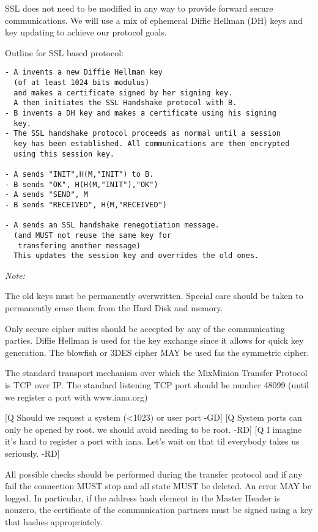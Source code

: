 \documentclass{article}
\begin{document}
SSL does not need to be modified in any way to provide forward secure
communications. We will use a mix of ephemeral Diffie Hellman (DH)
keys and key updating to achieve our protocol goals.

Outline for SSL based protocol:

\begin{verbatim}
- A invents a new Diffie Hellman key 
  (of at least 1024 bits modulus)
  and makes a certificate signed by her signing key.
  A then initiates the SSL Handshake protocol with B.
- B invents a DH key and makes a certificate using his signing
  key.
- The SSL handshake protocol proceeds as normal until a session
  key has been established. All communications are then encrypted
  using this session key.

- A sends "INIT",H(M,"INIT") to B.
- B sends "OK", H(H(M,"INIT"),"OK")
- A sends "SEND", M
- B sends "RECEIVED", H(M,"RECEIVED")

- A sends an SSL handshake renegotiation message.
  (and MUST not reuse the same key for 
   transfering another message)
  This updates the session key and overrides the old ones.
\end{verbatim}

\emph{Note:}

The old keys must be permanently overwritten. Special care should be
taken to permanently erase them from the Hard Disk and memory. 

Only secure cipher suites should be accepted by any of the
communicating parties. Diffie Hellman is used for the key exchange
since it allows for quick key generation. The blowfish or 3DES cipher
MAY be used fas the symmetric cipher.

The standard transport mechanism over which the MixMinion Transfer
Protocol is TCP over IP. The standard listening TCP port should be 
number 48099 (until we register a port with www.iana.org)

[Q Should we request a system (<1023) or user port -GD]
[Q System ports can only be opened by root. we should avoid needing
to be root. -RD]
[Q I imagine it's hard to register a port with iana. Let's wait on
that til everybody takes us seriously. -RD]

All possible checks should be performed during the transfer protocol
and if any fail the connection MUST stop and all state MUST
be deleted. An error MAY be logged. In particular, if the address
hash element in the Master Header is nonzero, the certificate of
the communication partners must be signed using a key that hashes
appropriately.
\end{document}
